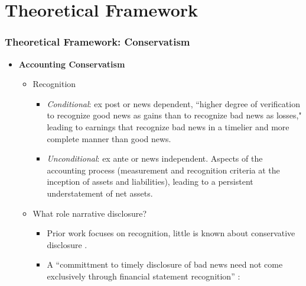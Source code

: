 \documentclass{beamer}
\begin{document}
\section{Theoretical Framework}
\begin{frame}
\frametitle{Theoretical Framework: Conservatism}
\begin{itemize}
	
	\item \textbf{Accounting Conservatism}
	
	\begin{itemize}
		
		\item Recognition \citep{beaverConditionalUnconditionalConservatism2005,ballEarningsQualityUK2005}
		\begin{itemize}
			\item \textit{Conditional}: ex post or news dependent, ``higher degree of verification to recognize good news as gains than to recognize bad news as losses," \citep*[p. 7]{basuConservatismPrincipleAsymmetric1997} leading to earnings that recognize bad news in a timelier and more complete manner than good news.
			\item \textit{Unconditional}: ex ante or news independent. Aspects of the accounting process (measurement and recognition criteria at the inception of assets and liabilities), leading to a persistent understatement of net assets.
		\end{itemize}
		\pause
		
		\medskip
		
		\item What role narrative disclosure? 
		\begin{itemize}		
			\item  Prior work focuses on recognition, little is known about conservative disclosure \cite[p.243]{kothariManagersWithholdBad2009}.	
			\item A ``committment to timely disclosure of bad news need not come exclusively through financial statement recognition'' \cite*[p. 73-74]{guayConservativeDisclosure2018}:
			
			
		\end{itemize}
		
	\end{itemize}
	
\end{itemize}
\end{frame}
\end{document}

